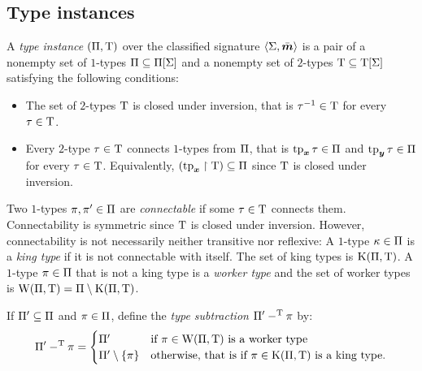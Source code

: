 \subsection{Type instances}
\begin{definition}\label{def:tpinst-twovar}
A \emph{type instance} $(\Pi,\mathrm{T})$ over the classified signature
$\left\langle \mathrm{\Sigma},\bar{\bm{m}} \right\rangle$ is a pair of a nonempty set of $1$-types
$\Pi\subseteq\Pi[\mathrm{\Sigma}]$ and a nonempty set of $2$-types $\mathrm{T}\subseteq\mathrm{T}[\mathrm{\Sigma}]$ satisfying the following conditions:
\begin{itemize}
  \item[\condtpii]
  The set of $2$-types $\mathrm{T}$ is closed under inversion, that is
  $\tau^{-1}\in\mathrm{T}$ for every $\tau\in\mathrm{T}$.
  \item[\condtpic]
  Every $2$-type $\tau\in\mathrm{T}$ connects $1$-types
  from $\Pi$, that is $\operatorname{tp}_{\bm{x}}\tau\in\Pi$ and $\operatorname{tp}_{\bm{y}}\tau\in\Pi$ for every
  $\tau\in\mathrm{T}$.
  Equivalently, 
  $(\operatorname{tp}_{\bm{x}}\restriction\mathrm{T})\subseteq\Pi$ since $\mathrm{T}$ is closed under
  inversion.
\end{itemize}
Two $1$-types $\pi, {\pi'} \in \Pi$ are \emph{connectable} if some
$\tau\in\mathrm{T}$ connects them.
Connectability is symmetric since $\mathrm{T}$ is closed under inversion.
However, connectability is not necessarily neither transitive nor reflexive:
A $1$-type $\kappa \in \Pi$ is a \emph{king type} if 
it is not connectable with itself.
The set of king types is $\mathrm{K}(\Pi,\mathrm{T})$.
A $1$-type $\pi \in \Pi$ that is not a king type is a \emph{worker type}
and the set of worker types is $\mathrm{W}(\Pi,\mathrm{T}) = \Pi \setminus \mathrm{K}(\Pi,\mathrm{T})$.

If ${\Pi'} \subseteq \Pi$ and $\pi \in \Pi$, define the
\emph{type subtraction} ${\Pi'} -^{\mathrm{T}} \pi$ by:
\[
  {\Pi'} -^{\mathrm{T}} \pi = \begin{cases}
    {\Pi'} &\text{if } \pi \in \mathrm{W}(\Pi,\mathrm{T}) \text{ is a worker type} \\
    {\Pi'} \setminus \left\{\pi\right\} &\text{otherwise, that is if } \pi \in
    \mathrm{K}(\Pi,\mathrm{T}) \text{ is a king type.}
  \end{cases}
\]
\end{definition}

